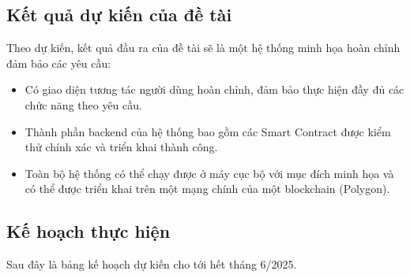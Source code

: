 \documentclass{article}[14pt]
\begin{document}
{    \subsection{Kết quả dự kiến của đề tài}
        Theo dự kiến, kết quả đầu ra của đề tài sẽ là một hệ thống minh họa hoàn chỉnh đảm bảo các yêu cầu: 
        \begin{itemize}
            \item Có giao diện tương tác người dùng hoàn chỉnh, đảm bảo thực hiện đầy đủ các chức năng theo yêu cầu. 
            \item Thành phần backend của hệ thống bao gồm các Smart Contract được kiểm thử chính xác và triển khai thành công. 
            \item Toàn bộ hệ thống có thể chạy được ở máy cục bộ với mục đích minh họa và có thể được triển khai trên một mạng chính của một blockchain (Polygon). 
        \end{itemize}
    
    \subsection{Kế hoạch thực hiện}
        Sau đây là bảng kế hoạch dự kiến cho tới hết tháng 6/2025.

}
\end{document}
